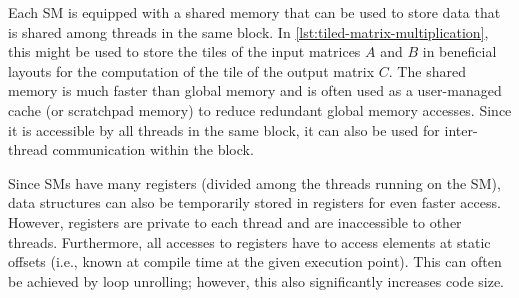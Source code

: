 
Each SM is equipped with a shared memory that can be used to store data that is shared among threads in the same block. In \cref{lst:tiled-matrix-multiplication}, this might be used to store the tiles of the input matrices $A$ and $B$ in beneficial layouts for the computation of the tile of the output matrix $C$\@. The shared memory is much faster than global memory and is often used as a user-managed cache (or scratchpad memory) to reduce redundant global memory accesses. Since it is accessible by all threads in the same block, it can also be used for inter-thread communication within the block.

Since SMs have many registers (divided among the threads running on the SM\@), data structures can also be temporarily stored in registers for even faster access. However, registers are private to each thread and are inaccessible to other threads. Furthermore, all accesses to registers have to access elements at static offsets (i.e., known at compile time at the given execution point). This can often be achieved by loop unrolling; however, this also significantly increases code size.



